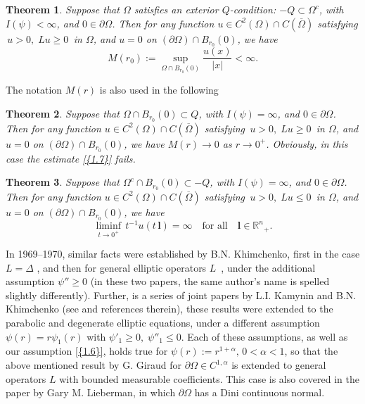 \documentclass[regno,12pt]{amsart}
\newtheorem{theorem}{Theorem}[section]
\theoremstyle{definition}
\theoremstyle{remark}
\begin{document}
\begin{theorem}\label{T1.9}
    Suppose that $\Omega$ satisfies an exterior $Q$-condition: $-Q{\subset}\Omega^c$, with $I(\psi)<{\infty}$, and $0\in{\partial\Omega}$.  Then for any function $u\in C^2(\Omega)\cap C({\overline{\Omega}})$ satisfying $\,u>0,\;Lu\ge 0\,$ in $\Omega$, and $u=0$ on $({\partial\Omega})\cap B_{r_0}(0)$, we have
    \begin{equation}\label{1.8}
        M(r_0):=\sup_{\Omega\cap B_{r_0}(0)}
        \frac{u(x)}{|x|}<{\infty}.
    \end{equation}
\end{theorem}

The notation $M(r)$ is also used in the following
\begin{theorem}\label{T1.10}
    Suppose that $\Omega\cap B_{r_0}(0){\subset} Q$, with $I(\psi)={\infty}$, and $0\in{\partial\Omega}$. Then for any function $u\in C^2(\Omega)\cap C({\overline{\Omega}})$ satisfying $\,u>0,\;Lu\ge 0\,$ in $\Omega$, and $u=0$ on $({\partial\Omega})\cap B_{r_0}(0)$, we have $M(r)\to 0$ as $r\to 0^+$.
    Obviously, in this case the estimate {\eqref{{1.7}}} fails.
\end{theorem}

\begin{theorem}\label{T1.11}
    Suppose that $\Omega^c\cap B_{r_0}(0){\subset} -Q$, with $I(\psi)={\infty}$, and $0\in{\partial\Omega}$. Then for any function $u\in C^2(\Omega)\cap C({\overline{\Omega}})$ satisfying $\,u>0,\;Lu\le 0\,$ in $\Omega$, and $u=0$ on $({\partial\Omega})\cap B_{r_0}(0)$, we have
         \begin{equation}\label{1.9}
        \liminf_{t\to 0^+}\, t^{-1} u(t\,{\bm{{l}}})={\infty}
        {\quad\text{{for all}}\quad} {\bm{{l}}}\in {{\mathbb R}^n}_+.
    \end{equation}
\end{theorem}

In 1969--1970, similar facts were  established by B.N. Khimchenko, first in the case $L=\Delta$ \cite{Kh69}, and then for general elliptic operators $L\,$ \cite{Kh70}, under the additional assumption $\psi''\ge 0$ (in these two papers, the same author's name is spelled slightly differently). Further, is a series of joint papers by L.I. Kamynin and B.N. Khimchenko (see \cite{KH80} and references therein), these results were extended to the parabolic and degenerate elliptic equations, under a different assumption $\psi(r)=r\psi_1(r)$ with $\psi'_1\ge 0,\;\psi''_1\le 0$. Each of these assumptions, as well as our assumption {\eqref{{1.6}}}, holds true for $\psi(r):=r^{1+\alpha},\,0<\alpha<1$, so that the above mentioned result by G. Giraud \cite{G33} for ${\partial\Omega}\in C^{1,\alpha}$ is extended to general operators $L$ with bounded measurable coefficients. This case is also covered in the paper \cite{L85} by Gary M. Lieberman, in which ${\partial\Omega}$ has a Dini continuous normal.
\end{document}
